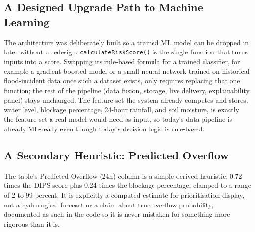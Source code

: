 \documentclass[11pt]{article}
\begin{document}
\subsection{A Designed Upgrade Path to Machine Learning}
The architecture was deliberately built so a trained ML model can be dropped in later without a redesign. \texttt{calculateRiskScore()} is the single function that turns inputs into a score. Swapping its rule-based formula for a trained classifier, for example a gradient-boosted model or a small neural network trained on historical flood-incident data once such a dataset exists, only requires replacing that one function; the rest of the pipeline (data fusion, storage, live delivery, explainability panel) stays unchanged. The feature set the system already computes and stores, water level, blockage percentage, 24-hour rainfall, and soil moisture, is exactly the feature set a real model would need as input, so today's data pipeline is already ML-ready even though today's decision logic is rule-based.

\subsection{A Secondary Heuristic: Predicted Overflow}
The table's Predicted Overflow (24h) column is a simple derived heuristic: 0.72 times the DIPS score plus 0.24 times the blockage percentage, clamped to a range of 2 to 99 percent. It is explicitly a computed estimate for prioritisation display, not a hydrological forecast or a claim about true overflow probability, documented as such in the code so it is never mistaken for something more rigorous than it is.
\end{document}
